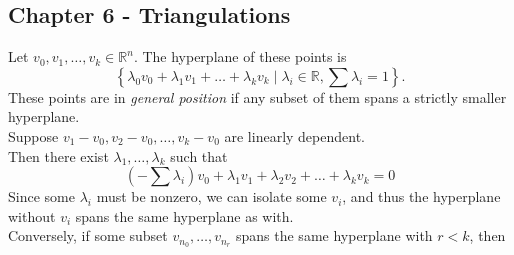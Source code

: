 \documentclass[a4paper]{article}
\begin{document}
\subsection*{Chapter 6 - Triangulations}
Let $v_0, v_1, \ldots, v_k \in \mathbb{R}^{n}$. The hyperplane of these
points is
\[
\left\{ \lambda_0 v_0 + \lambda_1 v_1 + \ldots + \lambda_k v_k
 \mid \lambda_i \in \mathbb{R}, \sum \lambda_i = 1 \right\}.
\] 
These points are in \textit{general position} if any subset 
of them spans a strictly smaller hyperplane.\\
\linebreak
Suppose $v_1- v_0, v_2 - v_0, \ldots, v_k - v_0$ are linearly dependent.\\
Then there exist $\lambda_1, \ldots, \lambda_k$ such that
 \[
     \left( - \sum \lambda_i \right) v_0 +
     \lambda_1 v_1 + \lambda_2 v_2 + \ldots + \lambda_k v_k = 0
\] 
Since some $\lambda_i$ must be nonzero, we can isolate some
$v_i$, and thus the hyperplane without $v_i$ spans the same hyperplane as
with.\\
\linebreak
Conversely, if some subset
$v_{n_0}, \ldots, v_{n_r}$ spans the same hyperplane with $r<k$, then
\end{document}
